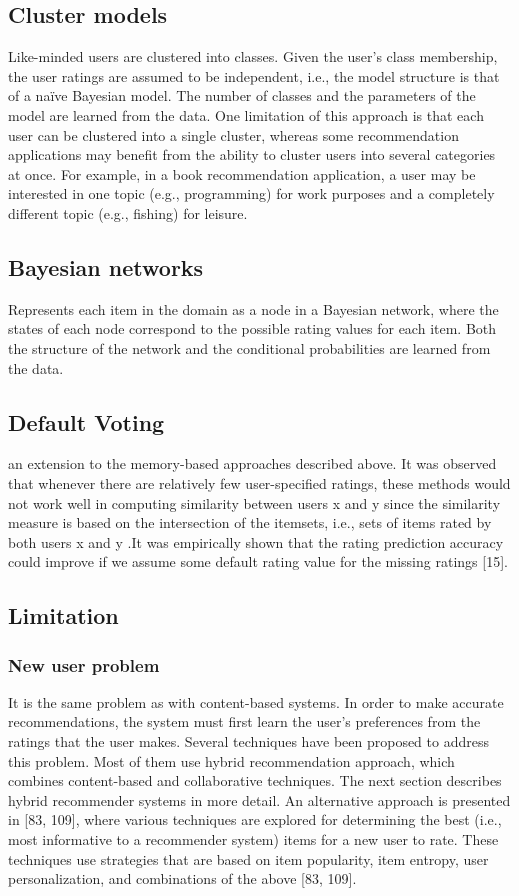 \subsection{Cluster models}
Like-minded users are clustered into classes. Given the user’s class membership, the user ratings are assumed to be independent, i.e., the model structure is that of a naïve Bayesian model. The number of classes and the parameters of the model are learned from the data.
One limitation of this approach is that each user can be clustered into a single cluster, whereas some recommendation applications may benefit from the ability to cluster users into several categories at once. For example, in a book recommendation application, a user may be interested in one topic (e.g., programming) for work purposes and a completely different topic (e.g., fishing) for leisure.

\subsection{Bayesian networks}
Represents each item in the domain as a node in a Bayesian network, where the states of each node correspond to the possible rating values for each item. Both the structure of the network and the conditional probabilities are learned from the data.
\subsection{Default Voting}
an extension to the memory-based approaches described above. It was observed that whenever there are relatively few user-specified ratings, these methods would not work well in computing similarity between users x and y since the similarity measure is based on the intersection of the itemsets, i.e., sets of items rated by both users x and y .It was empirically shown that the rating prediction accuracy could improve if we assume some default rating value for the missing ratings [15].
\subsection{Limitation}
\subsubsection{New user problem}
It is the same problem as with content-based systems. In order to make accurate recommendations, the system must first learn the user’s preferences from the ratings that the user makes. Several techniques have been proposed to address this problem. Most of them use hybrid recommendation approach, which combines content-based and collaborative techniques. The next section describes hybrid recommender systems in more detail. An alternative approach is presented in [83, 109], where various techniques are explored for determining the best (i.e., most informative to a recommender system) items for a new user to rate. These techniques use strategies that are based on item popularity, item entropy, user personalization, and combinations of the above [83, 109].

